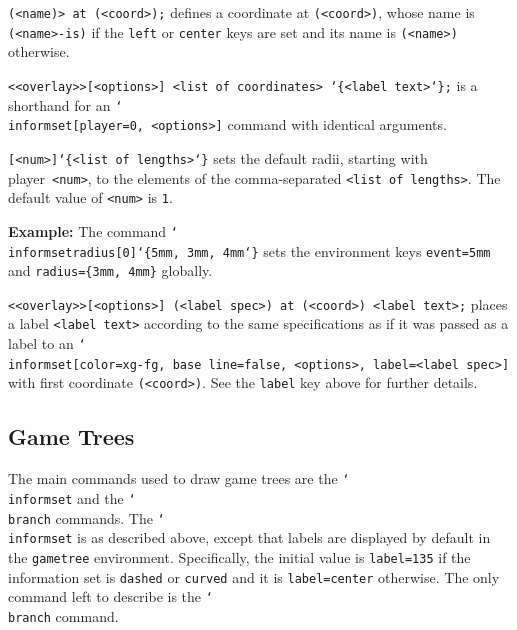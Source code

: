\documentclass{article}
\newenvironment{desc}{\itemize[leftmargin=50pt]}{\enditemize}
\def\macroarg#1#2{\item[\cmd{#1}] \hskip-2.5pt\texttt{#2}}
\renewcommand{\textbackslash}{\char`\\}
\def\cmd#1{\texttt{\color{cmd}\textbackslash#1}}
\def\leftbrace{\char`\{}
\def\rightbrace{\char`\}}
\def\arg#1{{\color{cmd}\leftbrace}{\color{black}#1}{\color{cmd}\rightbrace}}
\def\optarg[#1]{{\color{player1}[#1]}}
\begin{document}
\begin{desc}

\macroarg{coord}{(<name)> at (<coord>);} defines a coordinate at \texttt{(<coord>)}, whose name is \texttt{(<name>-is)} if the \texttt{left} or \texttt{center} keys are set and its name is \texttt{(<name>)} otherwise.

\macroarg{event}{<<overlay>>\optarg[<options>] <list of coordinates> \arg{<label text>};} is a shorthand for  an \cmd{informset\optarg[player=0, <options>]} command with identical arguments.

\macroarg{informsetradius}{\optarg[<num>]\arg{<list of lengths>}} sets the default radii, starting with player~\texttt{<num>}, to the elements of the comma-separated \texttt{<list of lengths>}. The default value of \texttt{<num>} is \texttt{1}.

{\color{player3}\textbf{Example:} The command \cmd{informsetradius}\texttt{\optarg[0]\arg{5mm, 3mm, 4mm}} sets the environment keys \texttt{event=5mm} and \texttt{radius=\{3mm, 4mm\}} globally.}

\macroarg{informlabel}{<<overlay>>\optarg[<options>] (<label spec>) at (<coord>) {<label text>};} places a label \texttt{<label text>} according to the same specifications as if it was passed as a label to an \cmd{informset\optarg[color=xg-fg, base line=false, <options>, label=<label spec>]} with first coordinate \texttt{(<coord>)}. See the \texttt{label} key above for further details.
\end{desc}



\subsection{Game Trees}

The main commands used to draw game trees are the \cmd{informset} and the \cmd{branch} commands. The \cmd{informset} is as described above, except that labels are displayed by default in the \texttt{gametree} environment. Specifically, the initial value is \texttt{label=135} if the information set is \texttt{dashed} or \texttt{curved} and it is \texttt{label=center} otherwise. %
The only command left to describe is the \cmd{branch} command.
\end{document}
